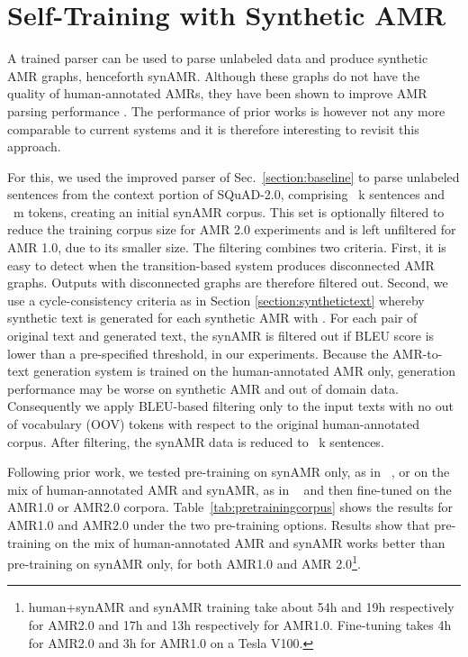 \documentclass[11pt,a4paper]{article}
\begin{document}
\section{Self-Training with Synthetic AMR}
\label{section:syntheticamr}
A trained parser can be used to parse unlabeled data and produce synthetic AMR graphs, henceforth synAMR. Although these graphs do not have the quality of human-annotated AMRs, they have been shown to improve AMR parsing performance \cite{konstas2017neural,noordbos2017amr}. The performance of prior works is however not any more comparable to current systems and it is therefore interesting to revisit this approach.







For this, we used the improved \cite{anon2020a} parser of Sec.~\ref{section:baseline} to parse unlabeled sentences from the context portion of SQuAD-2.0, comprising ~k sentences and ~m tokens, creating an initial synAMR corpus. This set is optionally filtered to reduce the training corpus size for AMR 2.0 experiments and is left unfiltered for AMR 1.0, due to its smaller size. The filtering combines two criteria. First, it is easy to detect when the transition-based system produces disconnected AMR graphs. Outputs with disconnected graphs are therefore filtered out. Second, we use a cycle-consistency criteria as in Section \ref{section:synthetictext} whereby synthetic text is generated for each synthetic AMR with \cite{mager-etal-2020-gpt-too}. For each pair of original text and generated text, the synAMR is filtered out if BLEU score \cite{papineni2002bleu} is lower than a pre-specified threshold,  in our experiments. Because the AMR-to-text generation system is trained on the human-annotated AMR only, generation performance may be worse on synthetic AMR and out of domain data. Consequently we apply BLEU-based filtering only to the input texts with no out of vocabulary (OOV) tokens with respect to the original human-annotated corpus. After filtering, the synAMR data is reduced to ~k sentences. 

Following prior work, we tested pre-training on synAMR only, as in ~\cite{konstas2017neural}, or on the mix of human-annotated AMR and synAMR, as in ~\cite{noordbos2017amr} and then fine-tuned on the AMR1.0 or AMR2.0 corpora. Table~\ref{tab:pretrainingcorpus} shows the results for AMR1.0 and AMR2.0 under the two pre-training options. Results show that pre-training on the mix of human-annotated AMR and synAMR works better than pre-training on synAMR only, for both AMR1.0 and AMR 2.0\footnote{human+synAMR and synAMR training take about 54h and 19h respectively for AMR2.0 and 17h and 13h respectively for AMR1.0. Fine-tuning takes 4h for AMR2.0 and 3h for AMR1.0 on a Tesla V100.}. 
\end{document}
